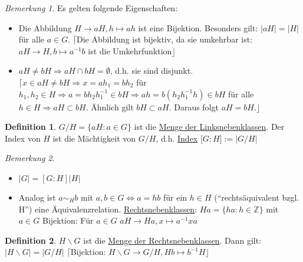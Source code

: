 \documentclass[fleqn, 12pt]{scrartcl}
\theoremstyle{definition}
\newtheorem*{defn}{Definition}
\theoremstyle{remark}
\newtheorem*{nb}{Bemerkung}
\begin{document}
\begin{nb}
	Es gelten folgende Eigenschaften: 
	\begin{itemize}
		\item Die Abbildung $H \rightarrow aH, h \mapsto ah$ ist eine Bijektion. Besonders gilt: $\vert aH \vert = \vert H \vert$ für alle $a \in G$. \newline $\lceil$Die Abbildung ist bijektiv, da sie umkehrbar ist: $aH \rightarrow H, b \mapsto a^{-1}b$ ist die Umkehrfunktion$\rfloor$
		\item $aH \neq bH \Rightarrow aH \cap bH = \emptyset$, d.h. sie sind disjunkt. \newline $\lceil x \in aH \neq bH \Rightarrow x = ah_{1} = bh_{2}$ für $h_{1},h_{2} \in H \Rightarrow a=bh_{2}h_{1}^{-1} \in bH \Rightarrow ah= b(h_{2}h_{1}^{-1}h) \in bH$ für alle $h \in H \Rightarrow aH \subset bH$. Ähnlich gilt $bH \subset aH$. Daraus folgt $aH=bH.\rfloor$
	\end{itemize}
\end{nb}

\begin{defn}
	$G/H = \lbrace aH : a \in G \rbrace$ ist die \underline{Menge der Linksnebenklassen}. \newline Der Index von $H$ ist die Mächtigkeit von $G/H$, d.h. \underline{Index} [$G:H$]$:=\vert G/H \vert$
\end{defn}

\begin{nb}
	\begin{itemize}
	 	\item $\vert G \vert = [G:H]\vert H\vert$
	 	\item Analog ist $a \sim_{H} b$ mit $a,b \in G \Leftrightarrow a=hb$ für ein $h \in H$ (“rechtsäquivalent bzgl. H”) eine Äquivalenzrelation. \newline \underline{Rechtsnebenklassen}: $Ha=\lbrace ha : h \in \mathbb{Z} \rbrace$ mit $a \in G$ \newline Bijektion: Für $a \in G$ $aH \rightarrow Ha, x \mapsto a^{-1}xa$
	\end{itemize}
\end{nb}

\begin{defn}
	$H \backslash G$ ist die \underline{Menge der Rechtsnebenklassen}. Dann gilt: $\vert H \backslash G \vert = \vert G/H \vert$ \newline $\lceil$Bijektion: $H \backslash G \rightarrow G/H, Hb \mapsto b^{-1}H \rfloor$
\end{defn}
\end{document}
